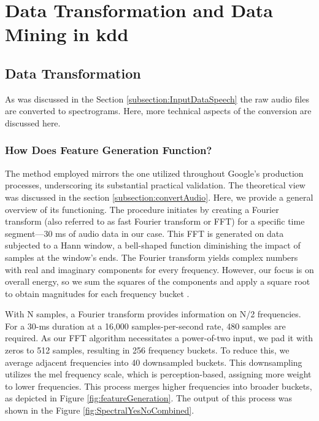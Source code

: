 %
%

\chapter{Data Transformation and Data Mining in \ac{kdd}}


\section{Data Transformation}
\label{section:DataTransformation}

As was discussed in the Section \ref{subsection:InputDataSpeech} the raw audio files are converted to spectrograms. Here, more technical aspects of the conversion are discussed here.

\subsection{How Does Feature Generation Function?}

The method employed mirrors the one utilized throughout Google's production processes, underscoring its substantial practical validation. The theoretical view was discussed in the section \ref{subsection:convertAudio}. Here, we provide a general overview of its functioning. 
The procedure initiates by creating a Fourier transform (also referred to as fast Fourier transform or FFT) for a specific time segment—30 ms of audio data in our case. This FFT is generated on data subjected to a Hann window, a bell-shaped function diminishing the impact of samples at the window's ends. The Fourier transform yields complex numbers with real and imaginary components for every frequency. However, our focus is on overall energy, so we sum the squares of the components and apply a square root to obtain magnitudes for each frequency bucket \cite{Warden:2019}.

With N samples, a Fourier transform provides information on N/2 frequencies. For a 30-ms duration at a 16,000 samples-per-second rate, 480 samples are required. As our FFT algorithm necessitates a power-of-two input, we pad it with zeros to 512 samples, resulting in 256 frequency buckets. To reduce this, we average adjacent frequencies into 40 downsampled buckets. This downsampling utilizes the mel frequency scale, which is perception-based, assigning more weight to lower frequencies. This process merges higher frequencies into broader buckets, as depicted in Figure \ref{fig:featureGeneration}. The output of this process was shown in the Figure \ref{fig:SpectralYesNoCombined}.

